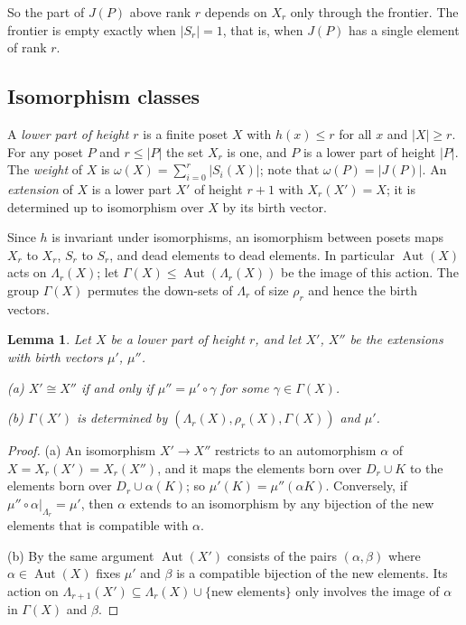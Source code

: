 \documentclass[11pt]{amsart}
\newtheorem{lemma}[theorem]{Lemma}
\theoremstyle{definition}
\theoremstyle{remark}
\newcommand{\Aut}{\operatorname{Aut}}
\begin{document}
So the part of $J(P)$ above rank $r$ depends on $X_r$ only through the frontier.  The
frontier is empty exactly when $|S_r| = 1$, that is, when $J(P)$ has a single element of
rank $r$.

\subsection{Isomorphism classes}
A \emph{lower part of height $r$} is a finite poset $X$ with $h(x) \le r$ for all
$x$ and $|X| \ge r$.  For any poset $P$ and $r \le |P|$ the set $X_r$ is one, and $P$ is
a lower part of height $|P|$.  The \emph{weight} of $X$ is
$\omega(X) = \sum_{i=0}^{r} |S_i(X)|$; note that $\omega(P) = |J(P)|$.  An
\emph{extension} of $X$ is a lower part $X'$ of height $r+1$ with $X_r(X') = X$; it is
determined up to isomorphism over $X$ by its birth vector.

Since $h$ is invariant under isomorphisms, an isomorphism between posets maps $X_r$ to
$X_r$, $S_r$ to $S_r$, and dead elements to dead elements.  In particular $\Aut(X)$ acts on
$\Lambda_r(X)$; let $\Gamma(X) \le \Aut(\Lambda_r(X))$ be the image of this action.  The group
$\Gamma(X)$ permutes the down-sets of $\Lambda_r$ of size $\rho_r$ and hence the birth
vectors.

\begin{lemma}\label{lem:sym}
Let $X$ be a lower part of height $r$, and let $X'$, $X''$ be the extensions with birth
vectors $\mu'$, $\mu''$.

\textup{(a)} $X' \cong X''$ if and only if $\mu'' = \mu' \circ \gamma$ for some
$\gamma \in \Gamma(X)$.

\textup{(b)} $\Gamma(X')$ is determined by $(\Lambda_r(X),\rho_r(X),\Gamma(X))$ and
$\mu'$.
\end{lemma}

\begin{proof}
(a) An isomorphism $X' \to X''$ restricts to an automorphism $\alpha$ of
$X = X_r(X') = X_r(X'')$, and it maps the elements born over $D_r \cup K$ to the
elements born over $D_r \cup \alpha(K)$; so $\mu'(K) = \mu''(\alpha K)$.  Conversely, if
$\mu'' \circ \alpha|_{\Lambda_r} = \mu'$, then $\alpha$ extends to an isomorphism by any
bijection of the new elements that is compatible with $\alpha$.

(b) By the same argument $\Aut(X')$ consists of the pairs $(\alpha,\beta)$ where
$\alpha \in \Aut(X)$ fixes $\mu'$ and $\beta$ is a compatible bijection of the new
elements.  Its action on $\Lambda_{r+1}(X') \subseteq \Lambda_r(X) \cup \{\text{new
elements}\}$ only involves the image of $\alpha$ in $\Gamma(X)$ and $\beta$.
\end{proof}
\end{document}
